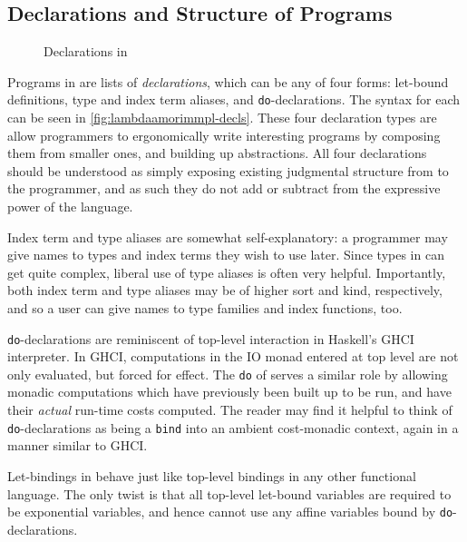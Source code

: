 \subsection{Declarations and Structure of \lambdaamorimpl Programs}
\begin{figure}

\caption{Declarations in \lambdaamorimpl}
\label{fig:lambdaamorimmpl-decls}
\end{figure}

Programs in \lambdaamorimpl are lists of \textit{declarations}, which can be any of four forms: let-bound definitions, type and index term aliases, and \texttt{do}-declarations. The syntax for each can be seen in \autoref{fig:lambdaamorimmpl-decls}. These four declaration types are allow programmers to ergonomically write interesting programs by composing them from smaller ones, and building up abstractions. All four declarations should be understood as simply exposing existing judgmental structure from \dlambdaamor to the programmer, and as such they do not add or subtract from the expressive power of the language.

Index term and type aliases are somewhat self-explanatory: a programmer may give names to types and index terms they wish to use later. Since types in \lambdaamorimpl can get quite complex, liberal use of type aliases is often very helpful. Importantly, both index term and type aliases may be of higher sort and kind, respectively, and so a user can give names to type families and index functions, too.

\texttt{do}-declarations are reminiscent of top-level interaction in Haskell's GHCI interpreter. In GHCI, computations in the IO monad entered at top level are not only evaluated, but forced for effect. The \texttt{do} of \lambdaamorimpl serves a similar role by allowing monadic computations which have previously been built up to be run, and have their \textit{actual} run-time costs computed. The reader may find it helpful to think of \texttt{do}-declarations as being a \texttt{bind} into an ambient cost-monadic context, again in a manner similar to GHCI.

Let-bindings in \lambdaamorimpl behave just like top-level bindings in any other functional language. The only twist is that all top-level let-bound variables are required to be exponential variables, and hence cannot use any affine variables bound by \texttt{do}-declarations.



